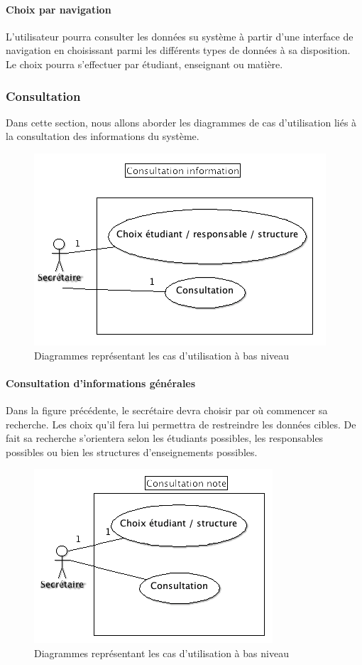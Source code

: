 \documentclass[letter, 11pt] {article}
\begin{document}
\paragraph{Choix par navigation}

L'utilisateur pourra consulter les données su système à partir d'une interface de navigation en choisissant parmi les différents types de données à sa disposition. Le choix pourra s'effectuer par étudiant, enseignant ou matière. 


\subsubsection{Consultation}

Dans cette section, nous allons aborder les diagrammes de cas d'utilisation liés à la consultation des informations du système.


\begin{figure}[!h]\centering
\includegraphics[scale = 0.65]{../UseCase/UseCaseBasNiveau/ConsultationInformation.png}
\caption{Diagrammes représentant les cas d'utilisation à bas niveau}
\end{figure}

\paragraph{Consultation d'informations générales}
Dans la figure précédente, le secrétaire devra choisir par où commencer sa recherche. Les choix qu'il fera lui permettra de restreindre les données cibles. De fait sa recherche s'orientera selon les étudiants possibles, les responsables possibles ou bien les structures d'enseignements possibles.

\begin{figure}[!h]\centering
\includegraphics[scale = 0.7]{../UseCase/UseCaseBasNiveau/ConsultationNote.png}
\caption{Diagrammes représentant les cas d'utilisation à bas niveau}
\end{figure}
\end{document}
